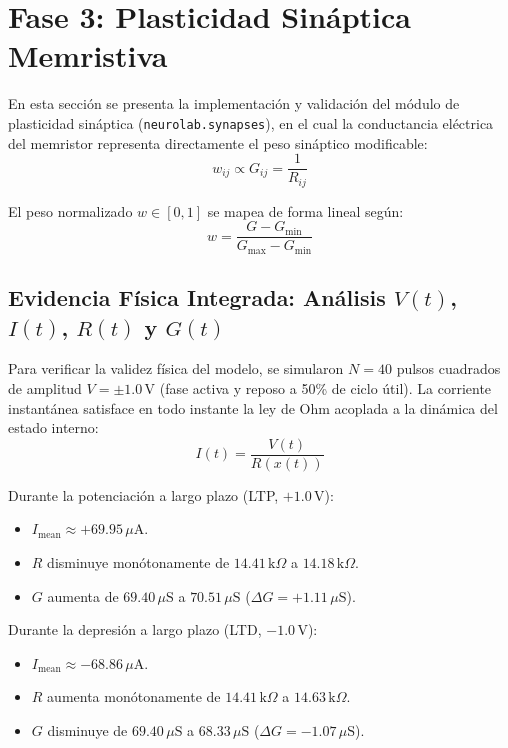 \section{Fase 3: Plasticidad Sináptica Memristiva}
\label{sec:fase3_plasticidad}

En esta sección se presenta la implementación y validación del módulo de plasticidad sináptica (\texttt{neurolab.synapses}), en el cual la conductancia eléctrica del memristor representa directamente el peso sináptico modificable:
\begin{equation}
    w_{ij} \propto G_{ij} = \frac{1}{R_{ij}}
\end{equation}

El peso normalizado $w \in [0, 1]$ se mapea de forma lineal según:
\begin{equation}
    w = \frac{G - G_{\min}}{G_{\max} - G_{\min}}
\end{equation}

\subsection{Evidencia Física Integrada: Análisis $V(t)$, $I(t)$, $R(t)$ y $G(t)$}
Para verificar la validez física del modelo, se simularon $N=40$ pulsos cuadrados de amplitud $V = \pm 1.0\,\text{V}$ (fase activa y reposo a 50\% de ciclo útil). La corriente instantánea satisface en todo instante la ley de Ohm acoplada a la dinámica del estado interno:
\begin{equation}
    I(t) = \frac{V(t)}{R(x(t))}
\end{equation}

Durante la potenciación a largo plazo (LTP, $+1.0\,\text{V}$):
\begin{itemize}
    \item $I_{\text{mean}} \approx +69.95\,\mu\text{A}$.
    \item $R$ disminuye monótonamente de $14.41\,\text{k}\Omega$ a $14.18\,\text{k}\Omega$.
    \item $G$ aumenta de $69.40\,\mu\text{S}$ a $70.51\,\mu\text{S}$ ($\Delta G = +1.11\,\mu\text{S}$).
\end{itemize}

Durante la depresión a largo plazo (LTD, $-1.0\,\text{V}$):
\begin{itemize}
    \item $I_{\text{mean}} \approx -68.86\,\mu\text{A}$.
    \item $R$ aumenta monótonamente de $14.41\,\text{k}\Omega$ a $14.63\,\text{k}\Omega$.
    \item $G$ disminuye de $69.40\,\mu\text{S}$ a $68.33\,\mu\text{S}$ ($\Delta G = -1.07\,\mu\text{S}$).
\end{itemize}

